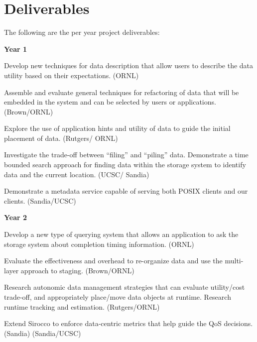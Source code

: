 \section{Deliverables}
The following are the per year project deliverables:

\textbf{Year 1}
\begin{tightItemize}
\item Develop new techniques for data description that allow users to 
describe the data utility based on their expectations. (ORNL)

\item Assemble and evaluate general techniques for refactoring of data
that will be embedded in the system and can be selected by users or applications. (Brown/ORNL)
\item Explore the use of application hints and utility of data to guide the initial placement of data. 
(Rutgers/ ORNL)
\item Investigate the trade-off between ``filing'' and ``piling'' data. 
Demonstrate a time bounded search approach for finding data within the storage system
to identify data and the current location. (UCSC/ Sandia)
\item Demonstrate a metadata service capable of serving both POSIX clients and our clients. (Sandia/UCSC)
\end{tightItemize}

\textbf{Year 2}
\begin{tightItemize}
\item Develop a new type of querying system that allows an application to ask the storage system
about completion timing information. (ORNL)
\item Evaluate the effectiveness and overhead to re-organize data and use the multi-layer approach 
to staging. (Brown/ORNL)
\item Research autonomic data management strategies that
can evaluate utility/cost trade-off, and appropriately place/move data objects at runtime. 
Research runtime tracking and estimation. (Rutgers/ORNL)
\item Extend Sirocco to enforce data-centric metrics that help guide the QoS decisions. (Sandia)
(Sandia/UCSC)
\end{tightItemize}

